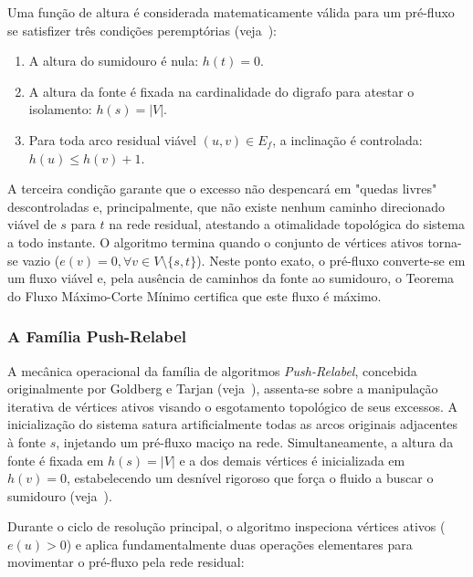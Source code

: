 \documentclass[12pt,a4paper]{article}
\begin{document}
Uma função de altura é considerada matematicamente válida para um pré-fluxo se satisfizer três condições peremptórias (veja~\cite{korte2018combinatorial}):
\begin{enumerate}
    \item A altura do sumidouro é nula: $h(t) = 0$.
    \item A altura da fonte é fixada na cardinalidade do digrafo para atestar o isolamento: $h(s) = |V|$.
    \item Para toda arco residual viável $(u,v) \in E_f$, a inclinação é controlada: $h(u) \le h(v) + 1$.
\end{enumerate}

A terceira condição garante que o excesso não despencará em "quedas livres" descontroladas e, principalmente, que não existe nenhum caminho direcionado viável de $s$ para $t$ na rede residual, atestando a otimalidade topológica do sistema a todo instante. O algoritmo termina quando o conjunto de vértices ativos torna-se vazio ($e(v) = 0, \forall v \in V \setminus \{s, t\}$). Neste ponto exato, o pré-fluxo converte-se em um fluxo viável e, pela ausência de caminhos da fonte ao sumidouro, o Teorema do Fluxo Máximo-Corte Mínimo certifica que este fluxo é máximo.

\subsubsection{A Família Push-Relabel}

A mecânica operacional da família de algoritmos \textit{Push-Relabel}, concebida originalmente por Goldberg e Tarjan (veja~\cite{goldberg1988new}), assenta-se sobre a manipulação iterativa de vértices ativos visando o esgotamento topológico de seus excessos. A inicialização do sistema satura artificialmente todas as arcos originais adjacentes à fonte $s$, injetando um pré-fluxo maciço na rede. Simultaneamente, a altura da fonte é fixada em $h(s) = |V|$ e a dos demais vértices é inicializada em $h(v) = 0$, estabelecendo um desnível rigoroso que força o fluido a buscar o sumidouro (veja~\cite{ahuja1993network}).

Durante o ciclo de resolução principal, o algoritmo inspeciona vértices ativos ($e(u) > 0$) e aplica fundamentalmente duas operações elementares para movimentar o pré-fluxo pela rede residual:
\end{document}
